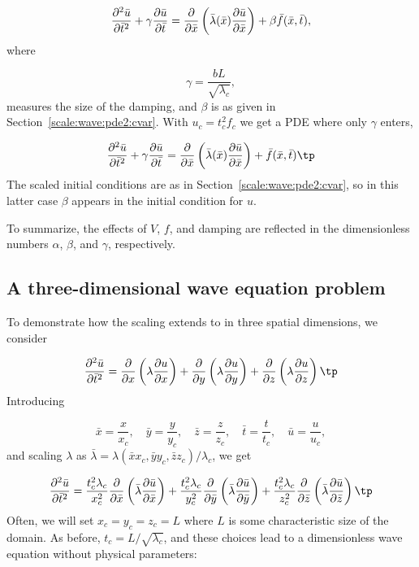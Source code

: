 \documentclass[graybox,envcountchap,sectrefs,final]{svmonodo}
\begin{document}
\begin{equation}
\frac{\partial^2 \bar u}{\partial \bar t^2}
+ \gamma\frac{\partial \bar u}{\partial \bar t} =
\frac{\partial}{\partial \bar x}\left(
\bar \lambda(\bar x) {\partial\bar u\over\partial\bar x}\right) +
\beta\bar f(\bar x,\bar t),
\end{equation}
where

\[ \gamma = \frac{bL}{\sqrt{\lambda_c}}, \]
measures the size of the damping, and $\beta$ is as given
in Section~\ref{scale:wave:pde2:cvar}.
With $u_c=t_c^2f_c$ we get a PDE where only $\gamma$ enters,

\begin{equation}
\frac{\partial^2 \bar u}{\partial \bar t^2}
+ \gamma\frac{\partial \bar u}{\partial \bar t} =
\frac{\partial}{\partial \bar x}\left(
\bar \lambda(\bar x) {\partial\bar u\over\partial\bar x}\right) +
\bar f(\bar x,\bar t)\tp
\end{equation}
The scaled initial conditions are as in
Section~\ref{scale:wave:pde2:cvar}, so in this latter case
$\beta$ appears in the initial condition for $u$.

To summarize, the effects of $V$, $f$, and damping are reflected in
the dimensionless numbers $\alpha$, $\beta$, and $\gamma$,
respectively.

\subsection{A three-dimensional wave equation problem}

To demonstrate how the scaling extends to in three spatial dimensions,
we consider

\begin{equation}
\frac{\partial^2 \bar u}{\partial \bar t^2} =
\frac{\partial}{\partial x}\left(\lambda\frac{\partial u}{\partial x}\right)+
\frac{\partial}{\partial y}\left(\lambda\frac{\partial u}{\partial y}\right)+
\frac{\partial}{\partial z}\left(\lambda\frac{\partial u}{\partial z}\right)\tp
\end{equation}
Introducing

\[ \bar x = \frac{x}{x_c},\quad \bar y = \frac{y}{y_c},
   \quad \bar z = \frac{z}{z_c},
   \quad \bar t = \frac{t}{t_c}, \quad \bar u =\frac{u}{u_c},\]
and scaling $\lambda$ as
$\bar\lambda = \lambda(\bar xx_c, \bar y y_c, \bar z z_c)/\lambda_c$,
we get

\[
\frac{\partial^2 \bar u}{\partial \bar t^2} =
\frac{t_c^2\lambda_c}{x_c^2}\frac{\partial}{\partial \bar x}\left(\bar\lambda\frac{\partial \bar u}{\partial \bar x}\right)+
\frac{t_c^2\lambda_c}{y_c^2}\frac{\partial}{\partial \bar y}\left(\bar\lambda\frac{\partial \bar u}{\partial \bar y}\right)+
\frac{t_c^2\lambda_c}{z_c^2}\frac{\partial}{\partial \bar z}\left(\bar\lambda\frac{\partial \bar u}{\partial \bar z}\right)\tp
\]
Often, we will set $x_c=y_c=z_c=L$ where $L$ is some characteristic
size of the domain.
As before, $t_c = L/\sqrt{\lambda_c}$, and these choices lead to a
dimensionless wave equation without physical parameters:
\end{document}

